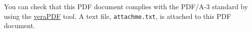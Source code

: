 \documentclass{article}
\begin{document}
  You can check that this PDF document complies with the PDF/A-3 standard by using the \href{https://verapdf.org/}{veraPDF} tool. A text file, \verb|attachme.txt|, is attached to this PDF document. 

\end{document}
